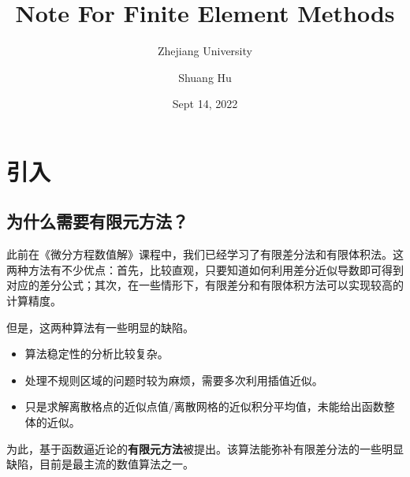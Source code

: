 \documentclass[lang=cn,10pt,newtx]{elegantbook}
\title{Note For Finite Element Methods}
\subtitle{Zhejiang University}
\author{Shuang Hu}
\institute{Zhejiang University}
\date{Sept 14, 2022}
\begin{document}
\maketitle
\frontmatter

\tableofcontents

\mainmatter

\chapter{引入}
\section{为什么需要有限元方法？}
此前在《微分方程数值解》课程中，我们已经学习了有限差分法和有限体积法。这两种方法有不少优点：首先，比较直观，只要知道如何利用差分近似导数即可得到对应的差分公式；其次，在一些情形下，有限差分和有限体积方法可以实现较高的计算精度。

但是，这两种算法有一些明显的缺陷。
\begin{itemize}
  \item 算法稳定性的分析比较复杂。
  \item 处理不规则区域的问题时较为麻烦，需要多次利用插值近似。
  \item 只是求解离散格点的近似点值/离散网格的近似积分平均值，未能给出函数整体的近似。
\end{itemize}

为此，基于函数逼近论的\textbf{有限元方法}被提出。该算法能弥补有限差分法的一些明显缺陷，目前是最主流的数值算法之一。
\end{document}
